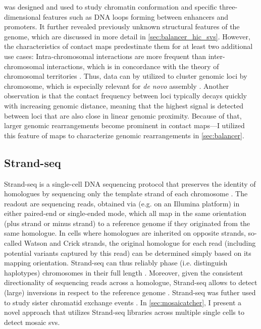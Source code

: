 \hic was designed and used to study chromatin conformation and specific
three-dimensional features such as DNA loops forming between enhancers and
promoters. It further revealed previously unknown structural features of the
genome, which are discussed in more detail in \cref{sec:balancer_hic_svs}.
However, the characteristics of \hic contact maps predestinate them for at least
two additional use cases: Intra-chromosomal interactions are more frequent than
inter-chromosomal interactions, which is in concordance with the theory of
chromosomal territories \citep{Meaburn2007}. Thus, \hic data can by utilized to
cluster genomic loci by chromosome, which is especially relevant for \textit{de
novo} assembly \citep{Burton2013}. Another observation is that the contact
frequency between loci typically decays quickly with increasing genomic
distance, meaning that the highest signal is detected between loci that are also
close in linear genomic proximity. Because of that, larger genomic
rearrangements become prominent in contact maps---I utilized this feature of
\hic maps to characterize genomic rearrangements in \cref{sec:balancer}.





\subsection{Strand-seq}
\label{sec:strandseq}

Strand-seq is a single-cell DNA sequencing protocol that preserves the identity
of homologues by sequencing only the template strand of each chromosome
\citep{Falconer2012,Sanders2017}. The readout are sequencing reads, obtained via
\mps (e.g. on an Illumina platform) in either paired-end or single-ended mode,
which all map in the same orientation (plus strand or minus strand) to a
reference genome if they originated from the same homologue. In cells where
homologues are inherited on opposite strands, so-called Watson and Crick
strands, the original homologue for each read (including potential variants
captured by this read) can be determined simply based
on its mapping orientation. Strand-seq can thus reliably phase (i.e. distinguish
haplotypes) chromosomes in their full length \citep{Porubsky2016}. Moreover,
given the consistent directionality of sequencing reads across a homologue,
Strand-seq allows to detect (large) inversions in respect to the reference
genome \citep{Sanders2016}.
Strand-seq was futher used to study sister chromatid exchange events
\citep{Falconer2012}. In \cref{sec:mosaicatcher}, I present a novel approach
that utilizes Strand-seq libraries across multiple single cells to detect mosaic
\acp{sv}.

